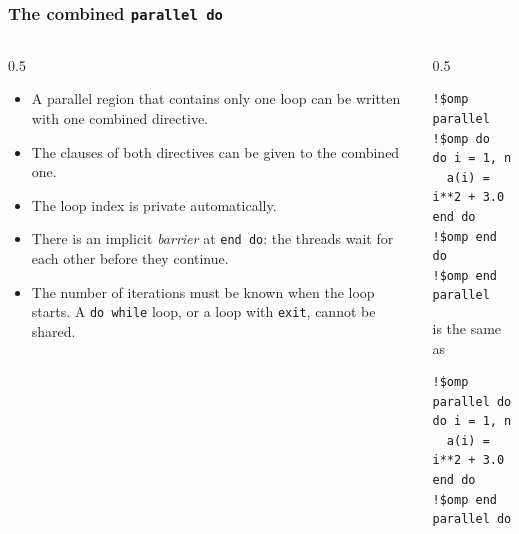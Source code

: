 \begin{frame}[fragile]
  \frametitle{The combined \texttt{parallel do}}
  \begin{columns}[T]
    \begin{column}{0.5\textwidth}
      \begin{itemize}
        \item A parallel region that contains only one loop can be written with one combined directive.
        \item The clauses of both directives can be given to the combined one.
        \item The loop index is private automatically.
        \item There is an implicit \emph{barrier} at \texttt{end do}: the threads wait for each other before they continue.
        \item The number of iterations must be known when the loop starts. A \texttt{do while} loop, or a loop with \texttt{exit}, cannot be shared.
      \end{itemize}
    \end{column}

    \begin{column}{0.5\textwidth}
      \begin{lstlisting}
!$omp parallel
!$omp do
do i = 1, n
  a(i) = i**2 + 3.0
end do
!$omp end do
!$omp end parallel
      \end{lstlisting}

      \vspace*{2mm}
      is the same as
      \begin{lstlisting}
!$omp parallel do
do i = 1, n
  a(i) = i**2 + 3.0
end do
!$omp end parallel do
      \end{lstlisting}
    \end{column}
  \end{columns}
\end{frame}


